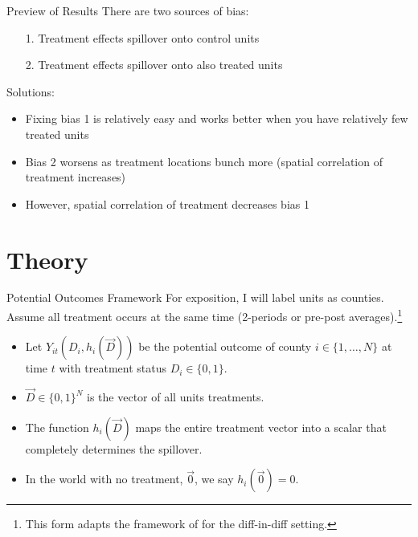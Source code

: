 \documentclass[aspectratio=43]{beamer}
\begin{document}
\begin{frame}{Preview of Results}
    There are two sources of bias:
        \begin{itemize}
            \item[1.] Treatment effects spillover onto control units
            \item[2.] Treatment effects spillover onto also treated units
        \end{itemize}

    Solutions:
        \begin{itemize}
            \item Fixing bias 1 is relatively easy and works better when you have relatively few treated units
            
            \item Bias 2 worsens as treatment locations bunch more (spatial correlation of treatment increases)
            
            \item However, spatial correlation of treatment decreases bias 1
        \end{itemize}
\end{frame}






\section{Theory}

\begin{frame}{Potential Outcomes Framework}
    For exposition, I will label units as counties. Assume all treatment occurs at the same time (2-periods or pre-post averages).\footnote{This form adapts the framework of \citet{Vazquez-Bare_2019} for the diff-in-diff setting.}
    
    \begin{itemize}
        \item Let $Y_{it}(D_i, h_i(\vec{D}))$ be the potential outcome of county $i \in \{ 1, \dots, N \}$ at time $t$ with treatment status $D_i \in \{0, 1\}$.
        
        \item $\vec{D} \in \{0,1\}^N$ is the vector of all units treatments.
        
        \item The function $h_i(\vec{D})$ maps the entire treatment vector into a scalar that completely determines the spillover. 
        
        \item In the world with no treatment, $\vec{0}$, we say $h_i(\vec{0}) = 0$.
    \end{itemize}
\end{frame}
\end{document}
